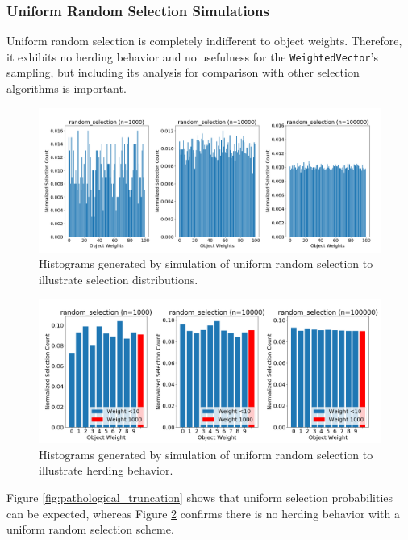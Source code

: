 \documentclass[12pt]{article}
\begin{document}
    \FloatBarrier

    \subsubsection{Uniform Random Selection Simulations}
    Uniform random selection is completely indifferent to object weights.
    Therefore, it exhibits no herding behavior and no usefulness for the
    \texttt{WeightedVector}'s sampling, but including its analysis for
    comparison with other selection algorithms is important.

    \begin{figure}[htbp]
      \centering
      \includegraphics[scale=0.32]{images/herding_random.png} 
      \caption{Histograms generated by simulation of uniform random selection
               to illustrate selection distributions.}
      \label{fig:herding_random}
    \end{figure}

    \begin{figure}[htbp]
      \centering
      \includegraphics[scale=0.32]{images/pathological_random.png} 
      \caption{Histograms generated by simulation of uniform random selection
               to illustrate herding behavior.}
      \label{fig:pathological_random}
    \end{figure}

    Figure \ref{fig:pathological_truncation} shows that uniform selection
    probabilities can be expected, whereas Figure \ref{fig:pathological_random}
    confirms there is no herding behavior with a uniform random selection
    scheme.
\end{document}
